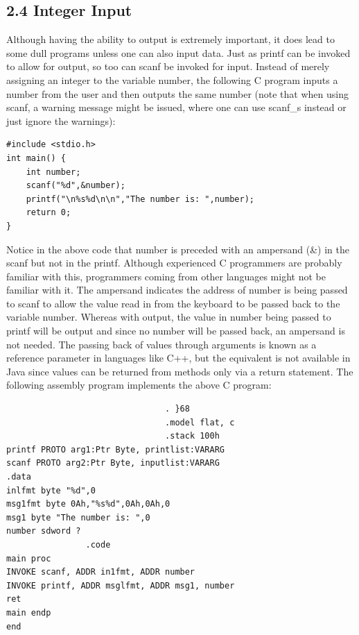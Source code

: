 \documentclass[10pt]{article}
\begin{document}
\subsection*{2.4 Integer Input}
Although having the ability to output is extremely important, it does lead to some dull programs unless one can also input data. Just as printf can be invoked to allow for output, so too can scanf be invoked for input. Instead of merely assigning an integer to the variable number, the following C program inputs a\\
number from the user and then outputs the same number (note that when using scanf, a warning message might be issued, where one can use scanf\_s instead or just ignore the warnings):

\begin{verbatim}
#include <stdio.h>
int main() {
    int number;
    scanf("%d",&number);
    printf("\n%s%d\n\n","The number is: ",number);
    return 0;
}
\end{verbatim}

Notice in the above code that number is preceded with an ampersand (\&) in the scanf but not in the printf. Although experienced C programmers are probably familiar with this, programmers coming from other languages might not be familiar with it. The ampersand indicates the address of number is being passed to scanf to allow the value read in from the keyboard to be passed back to the variable number. Whereas with output, the value in number being passed to printf will be output and since no number will be passed back, an ampersand is not needed. The passing back of values through arguments is known as a reference parameter in languages like C++, but the equivalent is not available in Java since values can be returned from methods only via a return statement. The following assembly program implements the above C program:

\begin{verbatim}
                                . }68
                                .model flat, c
                                .stack 100h
printf PROTO arg1:Ptr Byte, printlist:VARARG
scanf PROTO arg2:Ptr Byte, inputlist:VARARG
.data
inlfmt byte "%d",0
msg1fmt byte 0Ah,"%s%d",0Ah,0Ah,0
msg1 byte "The number is: ",0
number sdword ?
                .code
main proc
INVOKE scanf, ADDR in1fmt, ADDR number
INVOKE printf, ADDR msglfmt, ADDR msg1, number
ret
main endp
end
\end{verbatim}
\end{document}
